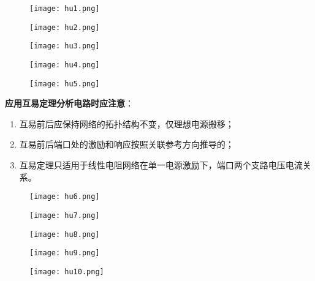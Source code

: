 \documentclass[UTF8]{report}
\theoremstyle{MyLineTheoremStyle} %
\theoremstyle{MyBlockTheoremStyle} %
\theoremstyle{MySubsubsectionStyle} %
\begin{document}
\begin{figure}[H]
    \centering
    \texttt{[image: hu1.png]}
\end{figure}

\begin{figure}[H]
    \centering
    \texttt{[image: hu2.png]}
\end{figure}

\begin{figure}[H]
    \centering
    \texttt{[image: hu3.png]}
\end{figure}

\begin{figure}[H]
    \centering
    \texttt{[image: hu4.png]}
\end{figure}

\begin{figure}[H]
    \centering
    \texttt{[image: hu5.png]}
\end{figure}

\textbf{应用互易定理分析电路时应注意}：
\begin{enumerate}
    \item 互易前后应保持网络的拓扑结构不变，仅理想电源搬移；
    \item 互易前后端口处的激励和响应按照关联参考方向推导的；
    \item 互易定理只适用于线性电阻网络在单一电源激励下，端口两个支路电压电流关系。
\end{enumerate}

\begin{figure}[H]
    \centering
    \texttt{[image: hu6.png]}
\end{figure}

\begin{figure}[H]
    \centering
    \texttt{[image: hu7.png]}
\end{figure}

\begin{figure}[H]
    \centering
    \texttt{[image: hu8.png]}
\end{figure}

\begin{figure}[H]
    \centering
    \texttt{[image: hu9.png]}
\end{figure}

\begin{figure}[H]
    \centering
    \texttt{[image: hu10.png]}
\end{figure}
\end{document}
